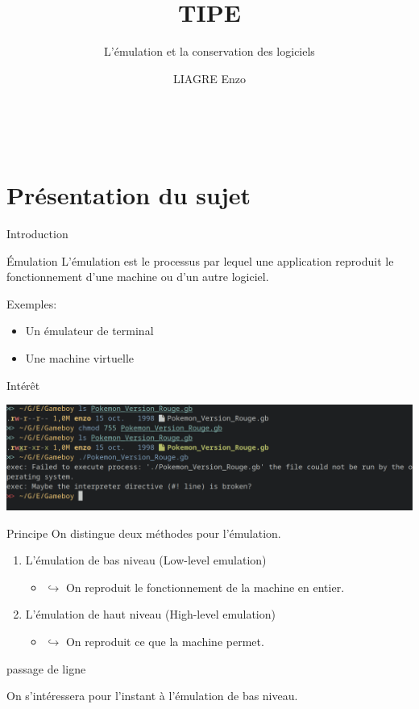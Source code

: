 \documentclass{beamer}
\title{TIPE}
\author{L'émulation et la conservation des logiciels}
\institute{}
\date{\scriptsize LIAGRE Enzo}
\begin{document}
    
    \begin{frame}
        \titlepage\
    \end{frame}

    
    
    \section{Présentation du sujet}

    \begin{frame}{Introduction}
        \begin{block}{Émulation}
            L'émulation est le processus par lequel une application reproduit le fonctionnement d'une machine ou d'un autre logiciel.
        \end{block}
        Exemples:
        \begin{itemize}
            \item Un émulateur de terminal
            \item Une machine virtuelle
        \end{itemize}
    \end{frame}

    \begin{frame}{Intérêt}
        \begin{center} 
            \includegraphics[width=1\textwidth]{images/erreur_permission.png}
        \end{center}   
    \end{frame}

    \begin{frame}{Principe}
        On distingue deux méthodes pour l'émulation.
        \begin{enumerate}
            \item L'émulation de bas niveau (Low-level emulation)
            \begin{itemize}
                \item[\color{white}] $\hookrightarrow$ On reproduit le fonctionnement de la machine en entier.
            \end{itemize}
            \item L'émulation de haut niveau (High-level emulation)
            \begin{itemize}
                \item[\color{white}] $\hookrightarrow$ On reproduit ce que la machine permet.
            \end{itemize}
        \end{enumerate}
        {\color{white} passage de ligne}

        On s'intéressera pour l'instant à l'émulation de bas niveau.
    \end{frame}
\end{document}
